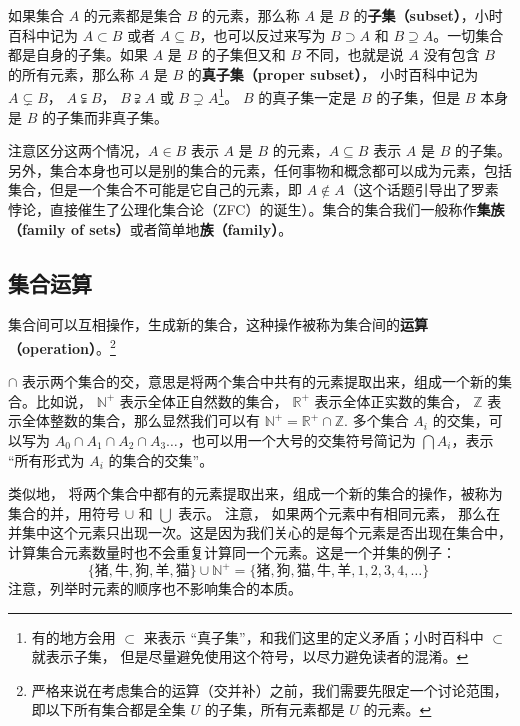 如果集合 $A$ 的元素都是集合 $B$ 的元素，那么称 $A$ 是 $B$ 的\textbf{子集（subset）}，小时百科中记为 $A\subset B$ 或者 $A\subseteq B$，也可以反过来写为 $B\supset A$ 和 $B\supseteq A$。一切集合都是自身的子集。如果 $A$ 是 $B$ 的子集但又和 $B$ 不同，也就是说 $A$ 没有包含 $B$ 的所有元素，那么称 $A$ 是 $B$ 的\textbf{真子集（proper subset）}， 小时百科中记为 $A\subsetneq B$， $A\subsetneqq B$， $B\supsetneqq A$ 或 $B\supsetneq A$\footnote{有的地方会用 $\subset$ 来表示 “真子集”，和我们这里的定义矛盾；小时百科中 $\subset$ 就表示子集， 但是尽量避免使用这个符号，以尽力避免读者的混淆。}。 $B$ 的真子集一定是 $B$ 的子集，但是 $B$ 本身是 $B$ 的子集而非真子集。

注意区分这两个情况，$A \in B$ 表示 $A$ 是 $B$ 的元素，$A \subseteq B$ 表示 $A$ 是 $B$ 的子集。另外，集合本身也可以是别的集合的元素，任何事物和概念都可以成为元素，包括集合，但是一个集合不可能是它自己的元素，即 $A \not\in A$（这个话题引导出了罗素悖论，直接催生了公理化集合论（ZFC）的诞生）。集合的集合我们一般称作\textbf{集族（family of sets）}或者简单地\textbf{族（family）}。

\subsection{集合运算}\label{sub_Set_1}

集合间可以互相操作，生成新的集合，这种操作被称为集合间的\textbf{运算（operation）}。\footnote{严格来说在考虑集合的运算（交并补）之前，我们需要先限定一个讨论范围，即以下所有集合都是全集 $U$ 的子集，所有元素都是 $U$ 的元素。}

$\cap$ 表示两个集合的交，意思是将两个集合中共有的元素提取出来，组成一个新的集合。比如说， $\mathbb{N^+}$ 表示全体正自然数的集合， $\mathbb{R^+}$ 表示全体正实数的集合， $\mathbb{Z}$ 表示全体整数的集合，那么显然我们可以有 $\mathbb{N^+}=\mathbb{R^+}\cap\mathbb{Z}$. 多个集合 $A_i$ 的交集，可以写为 $A_0\cap A_1\cap A_2\cap A_3\dots$，也可以用一个大号的交集符号简记为 $\bigcap A_i$，表示 “所有形式为 $A_i$ 的集合的交集”。

类似地， 将两个集合中都有的元素提取出来，组成一个新的集合的操作，被称为集合的并，用符号 $\cup$ 和 $\bigcup$ 表示。 注意， 如果两个元素中有相同元素， 那么在并集中这个元素只出现一次。这是因为我们关心的是每个元素是否出现在集合中，计算集合元素数量时也不会重复计算同一个元素。这是一个并集的例子：
\begin{equation}
\{\text{猪}, \text{牛}, \text{狗}, \text{羊}, \text{猫}\}\cup\mathbb{N^+}=\{\text{猪}, \text{狗}, \text{猫}, \text{牛}, \text{羊}, 1, 2,3,4,\dots\}~
\end{equation}
注意，列举时元素的顺序也不影响集合的本质。

